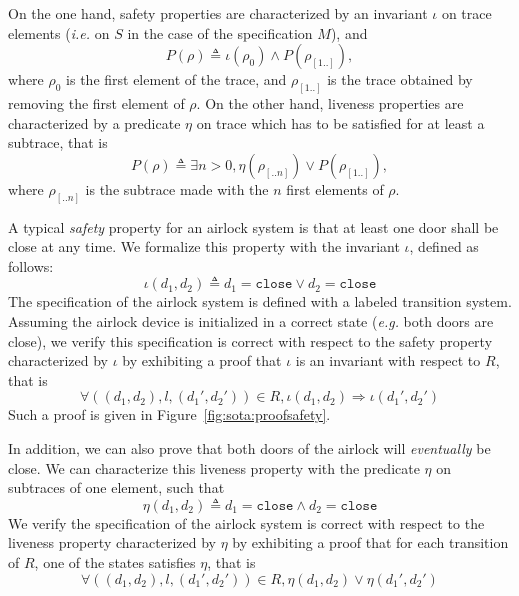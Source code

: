 On the one hand, safety properties are characterized by an invariant \( \iota \)
on trace elements (\emph{i.e.} on \( S \) in the case of the specification
\( M \)), and
%
\[
  P(\rho) \triangleq \iota(\rho_0) \wedge P(\rho_{[1..]}),
\]
%
where \( \rho_0 \) is the first element of the trace, and \( \rho_{[1..]} \) is
the trace obtained by removing the first element of \( \rho \).
%
On the other hand, liveness properties are characterized by a predicate
\( \eta \) on trace which has to be satisfied for at least a subtrace, that is
%
\[
  P(\rho) \triangleq \exists n > 0, \eta(\rho_{[..n]}) \vee P(\rho_{[1..]}),
\]
%
where \( \rho_{[..n]} \) is the subtrace made with the \( n \) first elements
of \( \rho \).

\begin{example}
  A typical \emph{safety} property for an airlock
  system is that at least one door shall be close at any time.
  We formalize this property with the invariant \( \iota \), defined as follows:
  \[
    \iota( d_1, d_2) \triangleq d_1 = \mathtt{close} \vee d_2 = \mathtt{close}
  \]
  The specification of the airlock system is defined with a labeled transition
  system.
  Assuming the airlock device is initialized in a correct state (\emph{e.g.}
  both doors are close), we verify this specification is correct with respect to
  the safety property characterized by \( \iota \) by exhibiting a proof that
  \( \iota \) is an invariant with respect to \( R \), that is
  \[
    \forall ((d_1, d_2), l, (d_1', d_2')) \in R, \iota(d_1, d_2) \Rightarrow
    \iota(d_1', d_2')
  \]
  Such a proof is given in Figure~\ref{fig:sota:proofsafety}. 

  In addition, we can also prove that both doors of the airlock will
  \emph{eventually} be close.
  We can characterize this liveness property with the predicate \( \eta \) on
  subtraces of one element, such that
  \[
    \eta(d_1, d_2) \triangleq d_1 = \mathtt{close} \wedge d_2 = \mathtt{close}
  \]
  We verify the specification of the airlock system is correct with respect to
  the liveness property characterized by \( \eta \) by exhibiting a proof that
  for each transition of \( R \), one of the states satisfies \( \eta \), that
  is
  \[
    \forall ((d_1, d_2), l, (d_1', d_2')) \in R, \eta(d_1, d_2) \vee \eta(d_1',
    d_2')
  \]

\end{example}

